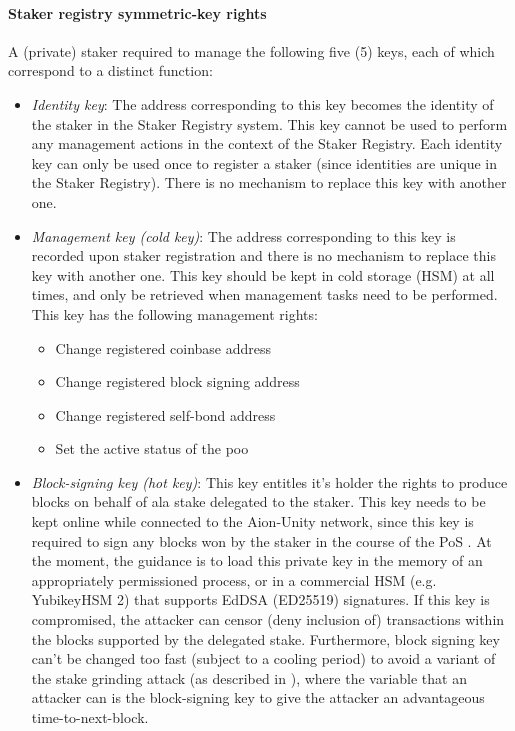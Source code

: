 \paragraph{Staker registry symmetric-key rights} \label{km_staker} A  (private) staker required to manage the following five (5) keys, each of which correspond to a distinct function: 
\begin{itemize}
    \item \textit{Identity key}: The address corresponding to this key becomes the identity of the staker in the Staker Registry system. This key cannot be used to perform any management actions in the context of the Staker Registry. Each identity key can only be used once to register a staker (since identities are unique in the Staker Registry). There is no mechanism to replace this key with another one.
    
    \item \textit{Management key (cold key)}: The address corresponding to this key is recorded upon staker registration and there is no mechanism to replace this key with another one. This key should be kept in cold storage (HSM) at all times, and only be retrieved when management tasks need to be performed. This key has the following management rights:
    \begin{itemize} [label=--,nosep]
        \item Change registered coinbase address
        \item Change registered block signing address
        \item Change registered self-bond address
        \item Set the active status of the poo
    \end{itemize}
    
    \item \textit{Block-signing key (hot key)}: This key entitles it's holder the rights to produce blocks on behalf of ala stake delegated to the staker. This key needs to be kept online while connected to the Aion-Unity network, since this key is required to sign any blocks won by the staker in the course of the PoS . At the moment, the guidance is to load this private key in the memory of an appropriately permissioned process, or in a commercial HSM (e.g. YubikeyHSM 2) that supports EdDSA (ED25519) signatures. If this key is compromised, the attacker can censor (deny inclusion of) transactions within the blocks supported by the delegated stake. Furthermore, block signing key can't be changed too fast (subject to a cooling period) to avoid a variant of the stake grinding attack (as described in \cite{WZS19}), where the variable that an attacker can  is the block-signing key to give the attacker an advantageous time-to-next-block. 
    

\end{itemize}
